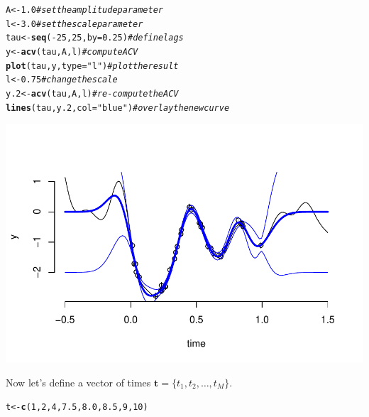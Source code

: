 \documentclass[a4paper,11pt]{article}\usepackage[]{graphicx}\usepackage[]{color}
\makeatletter
\def\maxwidth{ %
  \ifdim\Gin@nat@width>\linewidth
    \linewidth
  \else
    \Gin@nat@width
  \fi
}
\newcommand{\hlnum}[1]{\textcolor[rgb]{0.686,0.059,0.569}{#1}}%
\newcommand{\hlstr}[1]{\textcolor[rgb]{0.192,0.494,0.8}{#1}}%
\newcommand{\hlcom}[1]{\textcolor[rgb]{0.678,0.584,0.686}{\textit{#1}}}%
\newcommand{\hlopt}[1]{\textcolor[rgb]{0,0,0}{#1}}%
\newcommand{\hlstd}[1]{\textcolor[rgb]{0.345,0.345,0.345}{#1}}%
\newcommand{\hlkwb}[1]{\textcolor[rgb]{0.69,0.353,0.396}{#1}}%
\newcommand{\hlkwc}[1]{\textcolor[rgb]{0.333,0.667,0.333}{#1}}%
\newcommand{\hlkwd}[1]{\textcolor[rgb]{0.737,0.353,0.396}{\textbf{#1}}}%
\newenvironment{kframe}{%
 \def\at@end@of@kframe{}%
 \ifinner\ifhmode%
  \def\at@end@of@kframe{\end{minipage}}%
  \begin{minipage}{\columnwidth}%
 \fi\fi%
 \def\FrameCommand##1{\hskip\@totalleftmargin \hskip-\fboxsep
 \colorbox{shadecolor}{##1}\hskip-\fboxsep
     \hskip-\linewidth \hskip-\@totalleftmargin \hskip\columnwidth}%
 \MakeFramed {\advance\hsize-\width
   \@totalleftmargin\z@ \linewidth\hsize
   \@setminipage}}%
 {\par\unskip\endMakeFramed%
 \at@end@of@kframe}
\newenvironment{knitrout}{}{} %
\makeatother
\begin{document}
\begin{knitrout}
\color{fgcolor}\begin{kframe}
\begin{alltt}
\hlstd{A} \hlkwb{<-} \hlnum{1.0}   \hlcom{# set the amplitude parameter}
\hlstd{l} \hlkwb{<-} \hlnum{3.0}   \hlcom{# set the scale parameter}
\hlstd{tau} \hlkwb{<-} \hlkwd{seq}\hlstd{(}\hlopt{-}\hlnum{25}\hlstd{,} \hlnum{25}\hlstd{,} \hlkwc{by} \hlstd{=} \hlnum{0.25}\hlstd{)} \hlcom{# define lags}
\hlstd{y} \hlkwb{<-} \hlkwd{acv}\hlstd{(tau, A, l)}            \hlcom{# compute ACV}
\hlkwd{plot}\hlstd{(tau, y,} \hlkwc{type} \hlstd{=} \hlstr{"l"}\hlstd{)}       \hlcom{# plot the result}
\hlstd{l} \hlkwb{<-} \hlnum{0.75}                      \hlcom{# change the scale}
\hlstd{y.2} \hlkwb{<-} \hlkwd{acv}\hlstd{(tau, A, l)}          \hlcom{# re-compute the ACV}
\hlkwd{lines}\hlstd{(tau, y.2,} \hlkwc{col} \hlstd{=} \hlstr{"blue"}\hlstd{)}  \hlcom{# overlay the new curve}
\end{alltt}
\end{kframe}

{\centering \includegraphics[width=\maxwidth]{figure/unnamed-chunk-9-1} 

}



\end{knitrout}

Now let's define a vector of times $\mathbf{t} = \{t_1, t_2, \ldots, t_M\}$.

\begin{knitrout}
\color{fgcolor}\begin{kframe}
\begin{alltt}
 \hlstd{t} \hlkwb{<-} \hlkwd{c}\hlstd{(}\hlnum{1}\hlstd{,} \hlnum{2}\hlstd{,} \hlnum{4}\hlstd{,} \hlnum{7.5}\hlstd{,} \hlnum{8.0}\hlstd{,} \hlnum{8.5}\hlstd{,} \hlnum{9}\hlstd{,} \hlnum{10}\hlstd{)}
\end{alltt}
\end{kframe}
\end{knitrout}
\end{document}
